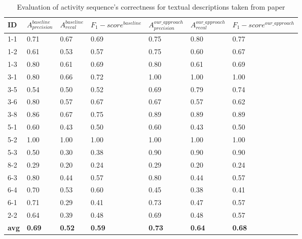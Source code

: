 \begin{table}[]
\caption{\centering Evaluation of activity sequence's correctness for textual descriptions taken from paper \cite{t2m_1_main}}
\label{table:eva_seq_01}
\begin{tabular}{|l|l|l|l|l|l|l|}
\hline
\textbf{ID} & $A^{baseline}_{precision}$      & $A^{baseline}_{recal}$           & $F_1-score^{baseline}$        & $A^{our\_approach}_{precision}$ & $A^{our\_approach}_{recal}$  &   $F_1-score^{our\_approach}$    \\ \hline
1-1 & 0.71             & 0.67             & 0.69             & 0.75 & 0.80 & 0.77 \\ \hline
1-2 & 0.61             & 0.53             & 0.57             & 0.75 & 0.60 & 0.67 \\ \hline
1-3 & 0.80             & 0.61             & 0.69             & 0.80 & 0.61 & 0.69 \\ \hline
3-1 & 0.80             & 0.66             & 0.72             & 1.00 & 1.00 & 1.00 \\ \hline
3-5 & 0.54             & 0.50             & 0.52             & 0.69 & 0.79 & 0.74 \\ \hline
3-6 & 0.80             & 0.57             & 0.67             & 0.67 & 0.57 & 0.62 \\ \hline
3-8 & 0.86             & 0.67             & 0.75             & 0.89 & 0.89 & 0.89 \\ \hline
5-1 & 0.60             & 0.43             & 0.50             & 0.60 & 0.43 & 0.50 \\ \hline
5-2 & 1.00             & 1.00             & 1.00             & 1.00 & 1.00 & 1.00 \\ \hline
5-3 & 0.50             & 0.30             & 0.38             & 0.90 & 0.90 & 0.90 \\ \hline
8-2 & 0.29             & 0.20             & 0.24             & 0.29 & 0.20 & 0.24 \\ \hline
6-3 & 0.80             & 0.44             & 0.57             & 0.80 & 0.44 & 0.57 \\ \hline
6-4 & 0.70             & 0.53             & 0.60             & 0.45 & 0.38 & 0.41 \\ \hline
6-1 & 0.71             & 0.29             & 0.41             & 0.73 & 0.47 & 0.57 \\ \hline
2-2 & 0.64             & 0.39             & 0.48             & 0.69 & 0.48 & 0.57 \\ \hline
\textbf{avg} & \textbf{0.69} & \textbf{0.52} & \textbf{0.59} & \textbf{0.73}     & \textbf{0.64} & \textbf{0.68}  \\ \hline
\end{tabular}
\end{table}


